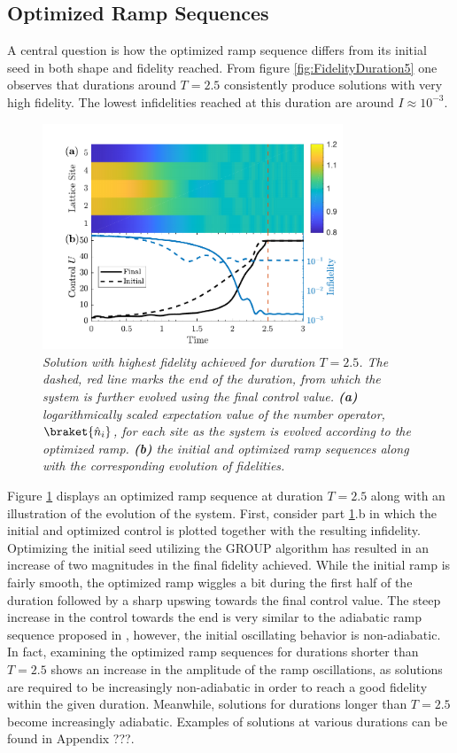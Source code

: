 \subsection{Optimized Ramp Sequences}
A central question is how the optimized ramp sequence differs from its initial seed in both shape and fidelity reached. From figure \ref{fig:FidelityDuration5} one observes that durations around $T = 2.5$ consistently produce solutions with very high fidelity. The lowest infidelities reached at this duration are around $I \approx 10^{-3}$. 
\begin{figure}[h!]
    \centering
    \includegraphics[width=0.8\textwidth]{Figures/5part/ExtendedRampT25.pdf}
    \caption{\textit{Solution with highest fidelity achieved for duration $T = 2.5$. The dashed, red line marks the end of the duration, from which the system is further evolved using the final control value. \textbf{(a)} logarithmically scaled expectation value of the number operator, $\braket{\hat{n}_i}$, for each site as the system is evolved according to the optimized ramp. \textbf{(b)} the initial and optimized ramp sequences along with the corresponding evolution of fidelities.}}
    \label{fig:ExtendedRamp5}
\end{figure}
Figure \ref{fig:ExtendedRamp5} displays an optimized ramp sequence at duration $T = 2.5$ along with an illustration of the evolution of the system. First, consider part \ref{fig:ExtendedRamp5}.b in which the initial and optimized control is plotted together with the resulting infidelity. Optimizing the initial seed utilizing the GROUP algorithm has resulted in an increase of two magnitudes in the final fidelity achieved.
While the initial ramp is fairly smooth, the optimized ramp wiggles a bit during the first half of the duration followed by a sharp upswing towards the final control value. The steep increase in the control towards the end is very similar to the adiabatic ramp sequence proposed in \cite{Zakrzewski2009}, however, the initial oscillating behavior is non-adiabatic. In fact, examining the optimized ramp sequences for durations shorter than $T = 2.5$ shows an increase in the amplitude of the ramp oscillations, as solutions are required to be increasingly non-adiabatic in order to reach a good fidelity within the given duration. Meanwhile, solutions for durations longer than $T = 2.5$ become increasingly adiabatic. Examples of solutions at various durations can be found in Appendix ???.\\
